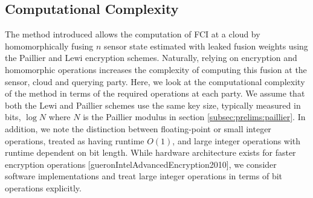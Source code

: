 \subsection{Computational Complexity}\label{subsec:cloud_fusion:secfci_comp_complexity}
The method introduced allows the computation of FCI at a cloud by homomorphically fusing $n$ sensor state estimated with leaked fusion weights using the Paillier and Lewi encryption schemes. Naturally, relying on encryption and homomorphic operations increases the complexity of computing this fusion at the sensor, cloud and querying party. Here, we look at the computational complexity of the method in terms of the required operations at each party. We assume that both the Lewi and Paillier schemes use the same key size, typically measured in bits, $\log{N}$ where $N$ is the Paillier modulus in section \ref{subsec:prelims:paillier}. In addition, we note the distinction between floating-point or small integer operations, treated as having runtime $O(1)$, and large integer operations with runtime dependent on bit length. While hardware architecture exists for faster encryption operations [gueronIntelAdvancedEncryption2010], we consider software implementations and treat large integer operations in terms of bit operations explicitly.

